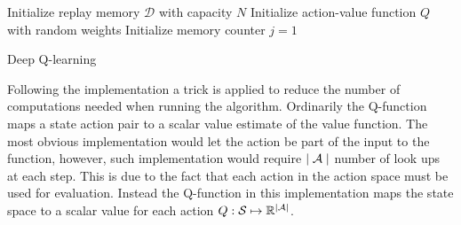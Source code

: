 \begin{algorithm}[H]
\SetAlgoLined
 Initialize replay memory $\mathcal{D}$ with capacity $N$\;
 Initialize action-value function $Q$ with random weights\;
 Initialize memory counter $j=1$\;
\caption{Deep Q-learning}
\label{alg:dqlearning}
\end{algorithm}

Following the implementation \textcite{mnih_playing_2013} a trick is applied to reduce the number of computations needed when running the algorithm. Ordinarily the Q-function maps a state action pair to a scalar value estimate of the value function. The most obvious implementation would let the action be part of the input to the function, however, such implementation would require $\mid \mathcal{A} \mid$ number of look ups at each step. This is due to the fact that each action in the action space must be used for evaluation. Instead the Q-function in this implementation maps the state space to a scalar value for each action $Q: \mathcal{S} \mapsto \mathbb{R}^{\mid \mathcal{A} \mid}$. 

